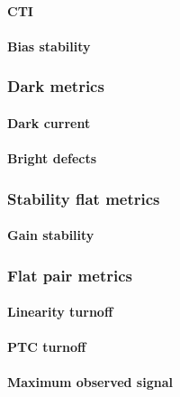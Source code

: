 \paragraph{CTI}\label{cti}

\paragraph{Bias stability}\label{bias-stability}

\subsubsection{Dark metrics}\label{dark-metrics-1}

\paragraph{Dark current}\label{dark-current-1}

\paragraph{Bright defects}\label{bright-defects-1}

\subsubsection{Stability flat metrics}\label{stability-flat-metrics-1}

\paragraph{Gain stability}\label{gain-stability}

\subsubsection{Flat pair metrics}\label{flat-pair-metrics-1}

\paragraph{Linearity turnoff}\label{linearity-turnoff}

\paragraph{PTC turnoff}\label{ptc-turnoff}

\paragraph{Maximum observed signal}\label{maximum-observed-signal}

